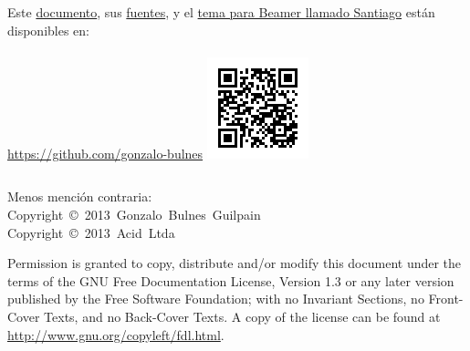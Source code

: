   \begin{frame}{\insertsubsection}

    \footnotesize
      \begin{columns}
          Este \href{https://github.com/gonzalo-bulnes/introduction-to-tests}{documento}, sus \href{hhttps://github.com/gonzalo-bulnes/introduction-to-tests}{fuentes}, y el \href{https://github.com/gonzalo-bulnes/santiago-beamer-theme}{tema para Beamer llamado Santiago} están disponibles en:\\~\\
          \url{https://github.com/gonzalo-bulnes}
        \hfill\includegraphics[width=\textwidth]{../../src/images/sources-talk.png}
      \end{columns}
    \normalsize

    \scriptsize{Menos mención contraria:}\\
    \noindent\scriptsize{Copyright~\copyright~2013~Gonzalo~Bulnes~Guilpain}\\
    \noindent\scriptsize{Copyright~\copyright~2013~Acid~Ltda}

    \scriptsize{Permission is granted to copy, distribute and/or modify this document
    under the terms of the GNU Free Documentation License, Version 1.3
    or any later version published by the Free Software Foundation;
    with no Invariant Sections, no Front-Cover Texts, and no Back-Cover Texts.
    A copy of the license can be found at \url{http://www.gnu.org/copyleft/fdl.html}.}
  \end{frame}

